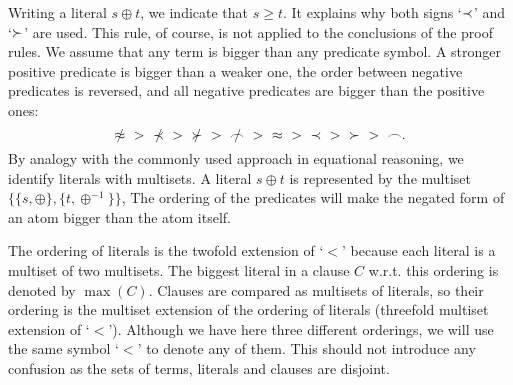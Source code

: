 Writing a literal $s\oplus t$, we indicate that \(s\geq 
t\). It explains why both
signs `$\mathbin{\prec}$' and  `$\mathbin{\succ}$' are used. This rule, of course, is not applied to the
conclusions of the proof rules. We assume that any
term is bigger than any predicate symbol.
A stronger positive predicate is bigger than a weaker one, the order between 
negative predicates is reversed, and all negative predicates are bigger than 
the positive ones:
 \begin{equation} \label{eq:predicate-order}
\notEq\ >\ \notIncl\ >\ \notCont\ >\ \notInt \ >\ \Eq\ >\ \Incl\ >\ \Cont\ >\ \Int.
 \end{equation}
By analogy with the commonly used approach in equational reasoning, we
identify literals with multisets.
A literal
$s\oplus t$ is represented by the multiset
\(\{\{s,\oplus\}, \{t,\oplus^{-1}\}\}\), 
The ordering of the predicates will make the negated form of an atom bigger
than the atom itself.

The ordering of literals is the twofold extension of `$<$' because each
literal is a multiset of two multisets. The biggest literal in a clause $C$ w.r.t.
this ordering is denoted by \(\max(C)\).  Clauses are compared as multisets of
literals, so their ordering is the multiset extension of the
ordering of literals (threefold multiset extension of `$<$'). Although
we have here three different orderings, we will use the same symbol `$<$' to
denote any of them. This should not introduce any confusion as the
 sets of terms, literals and clauses are disjoint.\\[8pt]
{}

